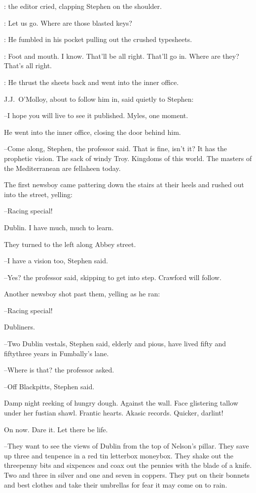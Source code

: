 :
the editor cried,
clapping Stephen on the shoulder.

\crawford:
Let us go.
Where are those blasted keys?

:
He fumbled in his pocket
pulling out the crushed typesheets.

\crawford:
Foot and mouth.
I know.
That'll be all right.
That'll go in.
Where are they?
That's all right.

:
He thrust the sheets back
and went into the inner office.



J.J.~O'Molloy,
about to follow him in,
said quietly to Stephen:

--I hope you will live to see it published.
Myles, one moment.

He went into the inner office,
closing the door behind him.

--Come along, Stephen,
the professor said.
That is fine, isn't it?
It has the prophetic vision.
The sack of windy Troy.
Kingdoms of this world.
The masters of the Mediterranean are fellaheen today.

The first newsboy came pattering down the stairs at their heels
and rushed out into the street,
yelling:

--Racing special!

Dublin.
I have much, much to learn.

They turned to the left along Abbey street.

--I have a vision too,
Stephen said.

--Yes?
the professor said,
skipping to get into step.
Crawford will follow.

Another newsboy shot past them,
yelling as he ran:

--Racing special!



Dubliners.

--Two Dublin vestals,
Stephen said,
elderly and pious,
have lived fifty and fiftythree years in Fumbally's lane.

--Where is that?
the professor asked.

--Off Blackpitts,
Stephen said.

Damp night reeking of hungry dough.
Against the wall.
Face glistering tallow under her fustian shawl.
Frantic hearts.
Akasic records.
Quicker, darlint!

On now.
Dare it.
Let there be life.

--They want to see the views of Dublin from the top of Nelson's pillar.
They save up three and tenpence in a red tin letterbox moneybox.
They shake out the threepenny bits and sixpences
and coax out the pennies with the blade of a knife.
Two and three in silver
and one and seven in coppers.
They put on their bonnets and best clothes
and take their umbrellas for fear it may come on to rain.

